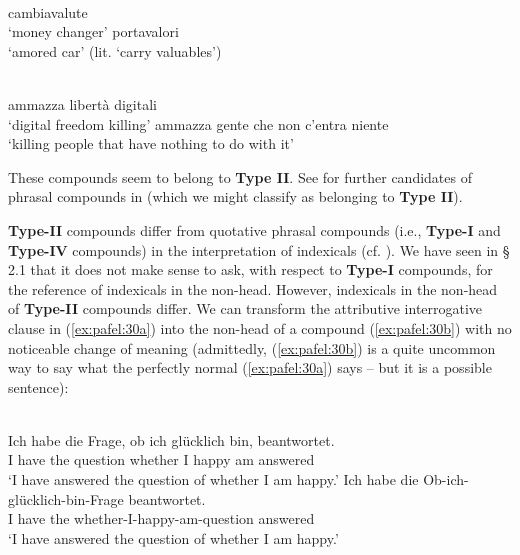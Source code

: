 \documentclass[output=paper]{LSP/langsci}
\begin{document}
\ea\label{ex:pafel:28}
      \\
      \ea\label{ex:pafel:28a}      
        cambiavalute  \\
      \glt  `money changer'
      \ex\label{ex:pafel:28b}
         portavalori   \\
      \glt  `amored car'  (lit. `carry valuables')
    \z
\z

\ea\label{ex:pafel:29}
      \\
      \ea\label{ex:pafel:29a}      
        ammazza {\ob}libertà digitali{\cb}  \\
      \glt  `digital freedom killing'
      \ex\label{ex:pafel:29b}
         ammazza {\ob}gente che non c'entra niente{\cb}   \\
      \glt  `killing people that have nothing to do with it'
    \z
\z

These compounds seem to belong to \textbf{Type II}. See \citet{Bisetto2015} for further candidates of phrasal compounds in  (which we might classify as belonging to \textbf{Type II}).
 
\textbf{Type-II} compounds differ from quotative phrasal compounds (i.e., \textbf{Type-I} and \textbf{Type-IV} compounds) in the interpretation of indexicals (cf. \citealt[277]{Pafel2015}). We have seen in § 2.1 that it does not make sense to ask, with respect to \textbf{Type-I} compounds, for the reference of indexicals in the non-head. However, indexicals in the non-head of \textbf{Type-II} compounds differ. We can transform the attributive interrogative clause in (\ref{ex:pafel:30a}) into the non-head of a compound (\ref{ex:pafel:30b}) with no noticeable change of meaning (admittedly, (\ref{ex:pafel:30b}) is a quite uncommon way to say what the perfectly normal (\ref{ex:pafel:30a}) says – but it is a possible sentence):

\ea
      \\
      \ea\label{ex:pafel:30a}      
      \gll  Ich habe die Frage, ob ich glücklich bin, beantwortet.\\
            I have the question whether I happy am answered \\
      \glt  `I have answered the question of whether I am happy.'
      \ex\label{ex:pafel:30b}
      \gll   Ich habe die Ob-ich-glücklich-bin-Frage beantwortet.  \\
             I have the whether-I-happy-am-question answered   \\
      \glt  `I have answered the question of whether I am happy.'
    \z
\z      
\end{document}
